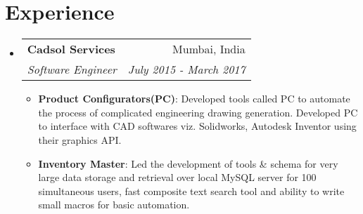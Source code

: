 \documentclass[letterpaper,9pt]{article}
\makeatletter
\newcommand{\resumeItem}[2]{
  \item\small{
    \textbf{#1}{: #2 \vspace{-2pt}}
  }
}
\newcommand{\resumeSubheading}[4]{
  \vspace{-1pt}\item
    \begin{tabular*}{0.97\textwidth}{l@{\extracolsep{\fill}}r}
      \textbf{#1} & #2 \\
      \textit{\small#3} & \textit{\small #4} \\
    \end{tabular*}\vspace{-5pt}
}
\newcommand{\resumeSubHeadingListStart}{\begin{itemize}[leftmargin=*]}
\newcommand{\resumeSubHeadingListEnd}{\end{itemize}}
\newcommand{\resumeItemListStart}{\begin{itemize}}
\newcommand{\resumeItemListEnd}{\end{itemize}\vspace{-5pt}}
\makeatother
\begin{document}
\section{Experience}
  \resumeSubHeadingListStart
    \resumeSubheading
      {Cadsol Services}{Mumbai, India}
      {Software Engineer}{July 2015 - March 2017}
      \resumeItemListStart
        \resumeItem{Product Configurators(PC)}
          {Developed tools called PC to automate the process of complicated engineering drawing generation. Developed PC to interface with CAD softwares viz. Solidworks, Autodesk Inventor using their graphics API.}
        \resumeItem{Inventory Master}{Led the development of tools \& schema for very large data storage and retrieval over local MySQL server for 100 simultaneous users, fast composite text search tool and ability to write small macros for basic automation.}
      \resumeItemListEnd
  \resumeSubHeadingListEnd
\end{document}
